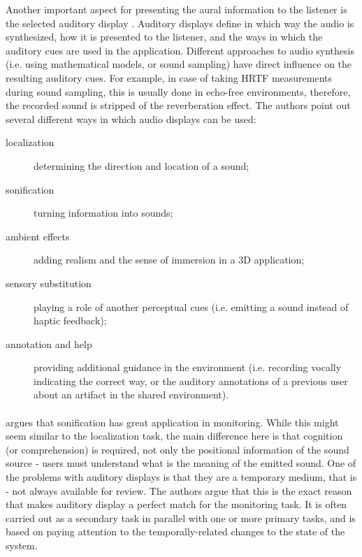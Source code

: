 Another important aspect for presenting the aural information to the listener is the selected auditory display \cite[p.~153]{jr_3d_2017}. Auditory displays define in which way the audio is synthesized, how it is presented to the listener, and the ways in which the auditory cues are used in the application.
Different approaches to audio synthesis (i.e. using mathematical models, or sound sampling) have direct influence on the resulting auditory cues. For example, in case of taking HRTF measurements during sound sampling, this is usually done in echo-free environments, therefore, the recorded sound is stripped of the reverberation effect.
The authors point out several different ways in which audio displays can be used:
\begin{description}
	\item[localization] determining the direction and location of a sound;
	\item[sonification] turning information into sounds;
	\item[ambient effects] adding realism and the sense of immersion in a 3D application;
	\item[sensory substitution] playing a role of another perceptual cues (i.e. emitting a sound instead of haptic feedback); 
	\item[annotation and help] providing additional guidance in the environment (i.e. recording vocally indicating the correct way, or the auditory annotations of a previous user about an artifact in the shared environment).
\end{description}

\paragraph[Sonification for monitoring]{}
\cite{hermann_sonification_2011} argues that sonification has great application in monitoring. While this might seem similar to the localization task, the main difference here is that cognition (or comprehension) is required, not only the positional information of the sound source - users must understand what is the meaning of the emitted sound.
One of the problems with auditory displays is that they are a temporary medium, that is - not always available for review. The authors argue that this is the exact reason that makes auditory display a perfect match for the monitoring task. It is often carried out as a secondary task in parallel with one or more primary tasks, and is based on paying attention to the temporally-related changes to the state of the system.

